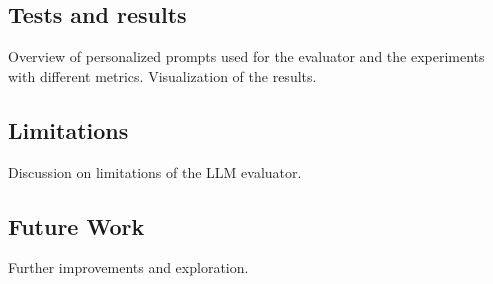 \subsection{Tests and results}
Overview of personalized prompts used for the evaluator and the experiments with different metrics. Visualization of the results.

\subsection{Limitations}
Discussion on limitations of the LLM evaluator.

\subsection{Future Work}
Further improvements and exploration.
